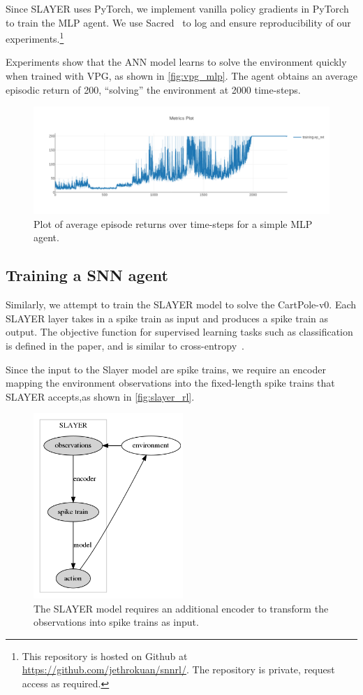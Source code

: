\documentclass[fyp]{socreport}
\begin{document}
Since SLAYER uses PyTorch, we implement vanilla policy gradients in PyTorch to
train the MLP agent. We use Sacred~\cite{klaus_greff-proc-scipy-2017} to log and
ensure reproducibility of our experiments.\footnote{This repository is hosted on
Github at \url{https://github.com/jethrokuan/snnrl/}. The repository is private,
request access as required.}

Experiments show that the ANN model learns to solve the environment quickly when
trained with VPG, as shown in \autoref{fig:vpg_mlp}. The agent obtains an
average episodic return of 200, ``solving'' the environment at 2000 time-steps.

\begin{figure}[htbp] \centering
\includegraphics[width=.9\linewidth]{images/vpg_mlp.png}
\caption{\label{fig:vpg_mlp} Plot of average episode returns over time-steps for
a simple MLP agent.}
\end{figure}

\subsection{Training a SNN agent}

Similarly, we attempt to train the SLAYER model to solve the CartPole-v0. Each
SLAYER layer takes in a spike train as input and produces a spike train as
output. The objective function for supervised learning tasks such as
classification is defined in the paper, and is similar to
cross-entropy~\cite{NIPS2018_7415}.

Since the input to the Slayer model are spike trains, we require an encoder
mapping the environment observations into the fixed-length spike trains that
SLAYER accepts,as shown in \autoref{fig:slayer_rl}.

\begin{figure}[htbp] \centering
\includegraphics[height=7cm]{images/snn_encode.png}
\caption{\label{fig:slayer_rl} The SLAYER model requires an additional encoder
to transform the observations into spike trains as input.}
\end{figure}
\end{document}
